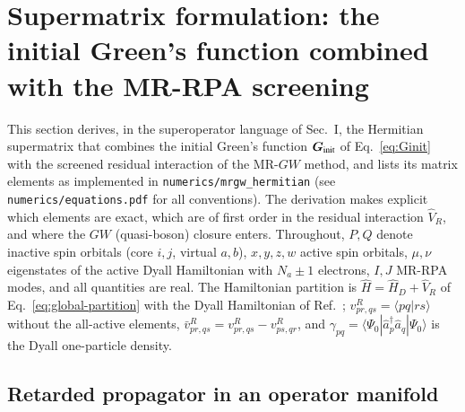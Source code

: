 \documentclass[aip,jcp,reprint,noshowkeys,superscriptaddress]{revtex4-1}
\newcommand{\bG}{\boldsymbol{G}}
\begin{document}
\section{Supermatrix formulation: the initial Green's function combined with the MR-RPA screening}
\label{sec:supermatrix}

This section derives, in the superoperator language of Sec.~I, the
Hermitian supermatrix that combines the initial Green's function
$\bG_{\rm init}$ of Eq.~\eqref{eq:Ginit} with the screened residual interaction of the
MR-$GW$ method, and lists its matrix elements as implemented in
\texttt{numerics/mrgw\_hermitian} (see \texttt{numerics/equations.pdf} for
all conventions).  The derivation makes explicit which elements are exact,
which are of first order in the residual interaction $\hat V_R$, and where
the $GW$ (quasi-boson) closure enters.  Throughout, $P,Q$ denote inactive
spin orbitals (core $i,j$, virtual $a,b$), $x,y,z,w$ active spin orbitals,
$\mu,\nu$ eigenstates of the active Dyall Hamiltonian with $N_a\pm1$
electrons, $I,J$ MR-RPA modes, and all quantities are real.  The
Hamiltonian partition is $\hat H=\hat H_D+\hat V_R$ of
Eq.~\eqref{eq:global-partition} with the Dyall Hamiltonian of
Ref.~\cite{WangFangLi2026}; $v^R_{pr,qs}=\langle pq|rs\rangle$ without the
all-active elements, $\bar v^R_{pr,qs}=v^R_{pr,qs}-v^R_{ps,qr}$, and
$\gamma_{pq}=\langle\Psi_0|\hat a_p^\dagger\hat a_q|\Psi_0\rangle$ is the
Dyall one-particle density.

\subsection{Retarded propagator in an operator manifold}
\end{document}
